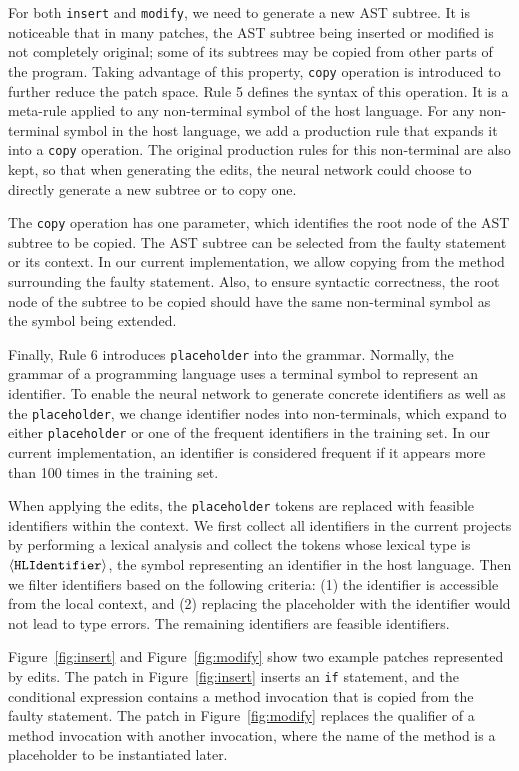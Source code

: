 For both {\tt insert} and {\tt modify}, we need to generate a new AST subtree. It is noticeable that in many patches, the AST subtree being inserted or modified is not completely original; some of its subtrees may be copied from other parts of the program. Taking advantage of this property, {\tt copy} operation is introduced to further reduce the patch space. Rule 5 defines the syntax of this operation. It is a meta-rule applied to any non-terminal symbol of the host language. For any non-terminal symbol in the host language, we add a production rule that expands it into a {\tt copy} operation. The original production rules for this non-terminal are also kept, so that when generating the edits, the neural network could choose to directly generate a new subtree or to copy one.

The {\tt copy} operation has one parameter, which identifies the root node of the AST subtree to be copied. The AST subtree can be selected from the faulty statement or its context. 
In our current implementation, we allow copying from the method surrounding the faulty statement. Also, to ensure syntactic correctness, the root node of the subtree to be copied should have the same non-terminal symbol as the symbol being extended. 

Finally, Rule 6 introduces {\tt placeholder} into the grammar. Normally, the grammar of a programming language uses a terminal symbol to represent an identifier. To enable the neural network to generate concrete identifiers as well as the {\tt placeholder}, we change identifier nodes into non-terminals, which expand to either {\tt placeholder} or one of the frequent identifiers in the training set. In our current implementation, an identifier is considered frequent if it appears more than 100 times in the training set. 

When applying the edits, the {\tt placeholder} tokens are replaced with feasible identifiers within the context. We first collect all identifiers in the current projects by performing a lexical analysis and collect the tokens whose lexical type is $\tt \langle HLIdentifier\rangle$, the symbol representing an identifier in the host language. Then we filter identifiers based on the following criteria: (1) the identifier is accessible from the local context, and (2) replacing the placeholder with the identifier would not lead to type errors. The remaining identifiers are feasible identifiers.

Figure~\ref{fig:insert} and Figure~\ref{fig:modify} show two example patches represented by edits. The patch in Figure~\ref{fig:insert} inserts an {\tt if} statement, and the conditional expression contains a method invocation that is copied from the faulty statement. The patch in Figure~\ref{fig:modify} replaces the qualifier of a method invocation with another invocation, where the name of the method is a placeholder to be instantiated later.

